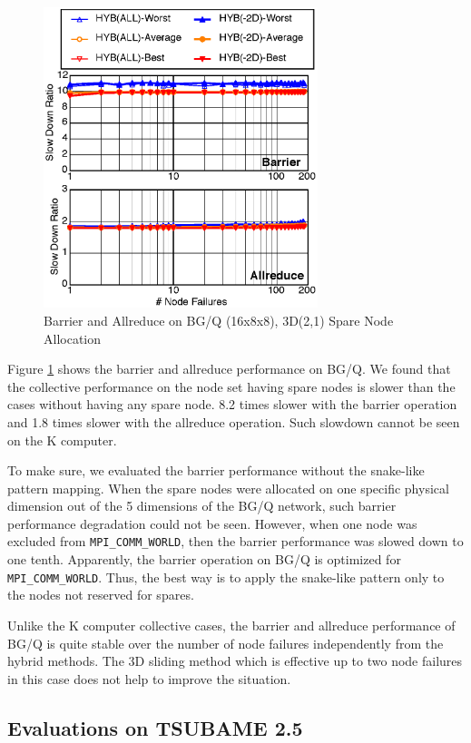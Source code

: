 \documentclass[Afour,times,sagev]{sagej}
\begin{document}
\begin{figure}[ht]
\centering
\includegraphics[width=80mm]{Figs/BGQ-Collective-CL.eps}
  \caption{Barrier and Allreduce on BG/Q (16x8x8), 3D(2,1) Spare Node
    Allocation}
  \label{fig:bgq-collective}
\end{figure}

Figure \ref{fig:bgq-collective} shows the barrier and allreduce
performance on BG/Q. We found that the collective performance on
the node set having spare nodes is slower than the cases without
having any spare node. 8.2 times slower with the barrier operation and
1.8 times slower with the allreduce operation. Such slowdown
cannot be seen on the K computer. 

To make sure, we evaluated the barrier performance
without the snake-like pattern mapping. When the spare nodes were
allocated on one specific physical dimension out of the 5 dimensions
of the BG/Q network, such barrier performance degradation could not be
seen. However, when one node was excluded from {\tt MPI\_COMM\_WORLD},
then the barrier performance was slowed down to one tenth. Apparently,
the barrier operation on BG/Q is optimized for {\tt
  MPI\_COMM\_WORLD}. Thus, the best way is to apply the snake-like
pattern only to the nodes not reserved for spares.

Unlike the K computer collective cases, the barrier and allreduce
performance of BG/Q is quite stable over the number of node failures
independently from the hybrid methods. The 3D sliding method which is
effective up to two node failures in this case does not help to improve the
situation. 

\subsection{Evaluations on TSUBAME 2.5}
\end{document}

